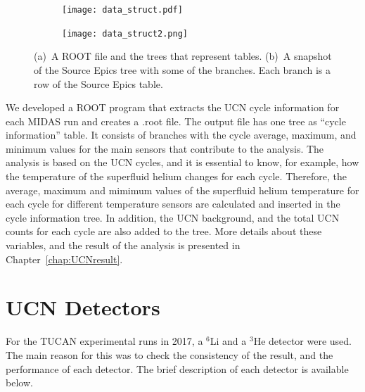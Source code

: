 \begin{figure}
\begin{subfigure}{.45\textwidth}
  \centering
  \texttt{[image: data\_struct.pdf]}
  \caption{}
  \label{fig:sfig1}
\end{subfigure}%
\begin{subfigure}{.45\textwidth}
  \centering
  \texttt{[image: data\_struct2.png]}
  \caption{}
  \label{fig:sfig2}
\end{subfigure}
\caption[TUCAN's data structure]{(a)~A ROOT file and the trees that
  represent tables. (b)~A snapshot of the Source Epics tree with some
  of the branches. Each branch is a row of the Source Epics table. }
\label{fig:data_struct}
\end{figure}

We developed a ROOT program that extracts the UCN cycle information
for each MIDAS run and creates a .root file.  The output file has one
tree as ``cycle information'' table. It consists of branches with the
cycle average, maximum, and minimum values for the main sensors that
contribute to the analysis.  The analysis is based on the UCN cycles,
and it is essential to know, for example, how the temperature of the
superfluid helium changes for each cycle. Therefore, the average,
maximum and mimimum values of the superfluid helium temperature for
each cycle for different temperature sensors are calculated and
inserted in the cycle information tree. In addition, the UCN
background, and the total UCN counts for each cycle are also added to
the tree. More details about these variables, and the result of the
analysis is presented in Chapter~\ref{chap:UCNresult}.






\section{UCN Detectors\label{sec:detectors}}
For the TUCAN experimental runs in 2017, a $^6$Li and a $^3$He
detector were used. The main reason for this was to check the
consistency of the result, and the performance of each detector. The
brief description of each detector is available below.

